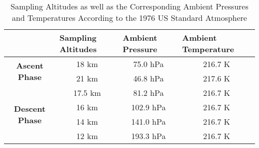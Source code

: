 
\begin{table}[H]
\centering
\begin{tabular}{|c|c|c|c|}
\hline
\multicolumn{1}{|l|}{} & \multicolumn{1}{l|}{\textbf{Sampling Altitudes}} & \multicolumn{1}{l|}{\textbf{Ambient Pressure}} & \multicolumn{1}{l|}{\textbf{Ambient Temperature}} \\ \hline
\multirow{2}{*}{\textbf{Ascent Phase}} & 18 km & 75.0 hPa & 216.7 K \\ \cline{2-4} 
 & 21 km & 46.8 hPa & 217.6 K \\ \hline
\multirow{4}{*}{\textbf{Descent Phase}} & 17.5 km & 81.2 hPa & 216.7 K \\ \cline{2-4} 
 & 16 km & 102.9 hPa & 216.7 K \\ \cline{2-4} 
 & 14 km & 141.0 hPa & 216.7 K \\ \cline{2-4} 
 & 12 km & 193.3 hPa & 216.7 K \\ \hline
\end{tabular}
\caption{Sampling Altitudes as well as the Corresponding Ambient Pressures and Temperatures According to the 1976 US Standard Atmosphere}
\label{tab:sampling-altitudes}
\end{table}